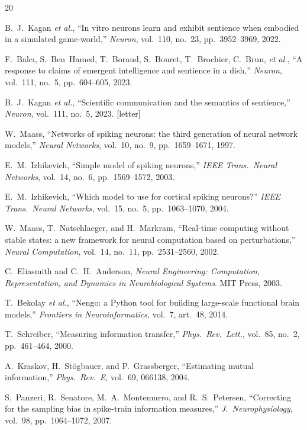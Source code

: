 \begin{thebibliography}{20}

B.~J.~Kagan \emph{et al.}, ``In vitro neurons learn and exhibit sentience when
embodied in a simulated game-world,'' \emph{Neuron}, vol.~110, no.~23,
pp.~3952--3969, 2022.

F.~Balc{\i}, S.~Ben~Hamed, T.~Boraud, S.~Bouret, T.~Brochier, C.~Brun,
\emph{et al.}, ``A response to claims of emergent intelligence and sentience in
a dish,'' \emph{Neuron}, vol.~111, no.~5, pp.~604--605, 2023.

B.~J.~Kagan \emph{et al.}, ``Scientific communication and the semantics of
sentience,'' \emph{Neuron}, vol.~111, no.~5, 2023. [letter]

W.~Maass, ``Networks of spiking neurons: the third generation of neural network
models,'' \emph{Neural Networks}, vol.~10, no.~9, pp.~1659--1671, 1997.

E.~M.~Izhikevich, ``Simple model of spiking neurons,'' \emph{IEEE Trans.\
Neural Networks}, vol.~14, no.~6, pp.~1569--1572, 2003.

E.~M.~Izhikevich, ``Which model to use for cortical spiking neurons?''
\emph{IEEE Trans.\ Neural Networks}, vol.~15, no.~5, pp.~1063--1070, 2004.

W.~Maass, T.~Natschlaeger, and H.~Markram, ``Real-time computing without stable
states: a new framework for neural computation based on perturbations,''
\emph{Neural Computation}, vol.~14, no.~11, pp.~2531--2560, 2002.

C.~Eliasmith and C.~H.~Anderson, \emph{Neural Engineering: Computation,
Representation, and Dynamics in Neurobiological Systems}. MIT Press, 2003.

T.~Bekolay \emph{et al.}, ``Nengo: a Python tool for building large-scale
functional brain models,'' \emph{Frontiers in Neuroinformatics}, vol.~7,
art.~48, 2014.

T.~Schreiber, ``Measuring information transfer,'' \emph{Phys.\ Rev.\ Lett.},
vol.~85, no.~2, pp.~461--464, 2000.

A.~Kraskov, H.~St{\"o}gbauer, and P.~Grassberger, ``Estimating mutual
information,'' \emph{Phys.\ Rev.\ E}, vol.~69, 066138, 2004.

S.~Panzeri, R.~Senatore, M.~A.~Montemurro, and R.~S.~Petersen, ``Correcting for
the sampling bias in spike-train information measures,'' \emph{J.\
Neurophysiology}, vol.~98, pp.~1064--1072, 2007.


\end{thebibliography}
